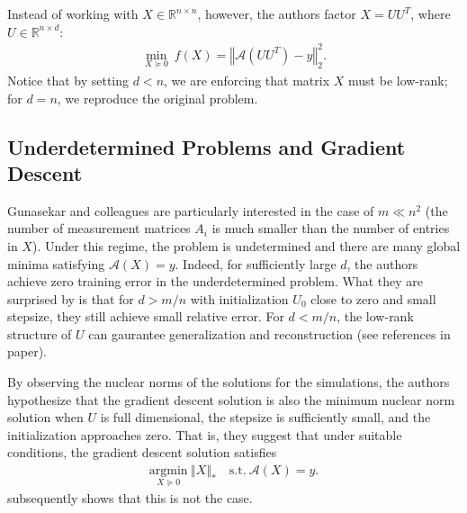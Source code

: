 \documentclass{article}
\begin{document}
Instead of working with $X \in \mathbb{R}^{n \times n}$, however, the authors factor $X = UU^T$, where $U \in \mathbb{R}^{n \times d}$:
\begin{align*}
    \underset{X \succeq 0}{\min} \ f(X) = \left\Vert \mathcal{A}(UU^T) - y \right\Vert_2^2.
\end{align*}
Notice that by setting $d < n$, we are enforcing that matrix $X$ must be low-rank; for $d = n$, we reproduce the original problem.

\subsection{Underdetermined Problems and Gradient Descent}
Gunasekar and colleagues are particularly interested in the case of $m \ll n^2$ (the number of measurement matrices $A_i$ is much smaller than the number of entries in $X$). Under this regime, the problem is undetermined and there are many global minima satisfying $\mathcal{A}(X) = y$. Indeed, for sufficiently large $d$, the authors achieve zero training error in the underdetermined problem. What they are surprised by is that for $d > m/n$ with initialization $U_0$ close to zero and small stepsize, they still achieve small relative error. For $d < m/n$, the low-rank structure of $U$ can gaurantee generalization and reconstruction (see references in paper). 

By observing the nuclear norms of the solutions for the simulations, the authors hypothesize that the gradient descent solution is also the minimum nuclear norm solution when $U$ is full dimensional, the stepsize is sufficiently small, and the initialization approaches zero. That is, they suggest that under suitable conditions, the gradient descent solution satisfies
\begin{align*}
    \underset{X \succeq 0}{\text{argmin}} \ \left\Vert X \right\Vert_* \quad \text{s.t.} \ \mathcal{A}(X) = y.
\end{align*}
\cite{arora2019implicit} subsequently shows that this is not the case.
\end{document}
